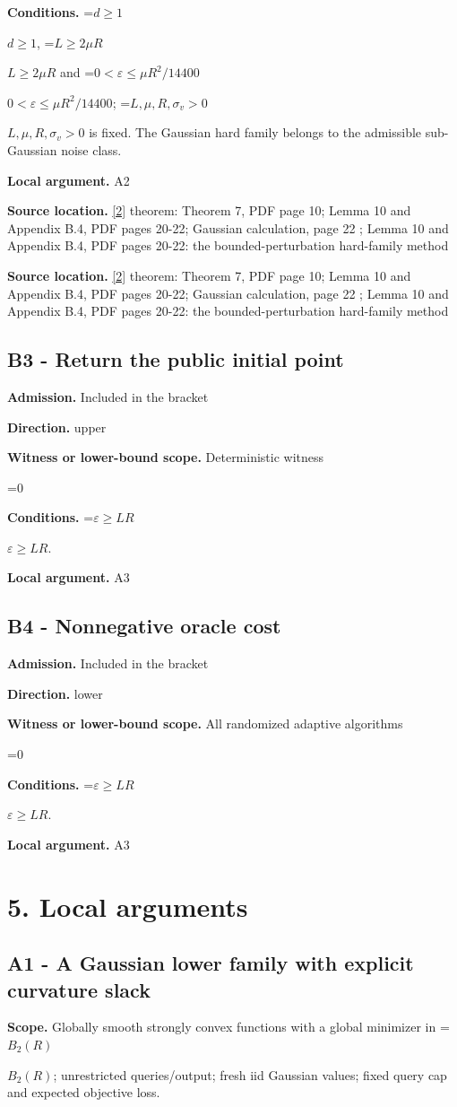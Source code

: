 \documentclass[10pt,a4paper]{article}
\newcommand{\AtlasMath}[1]{\par\begingroup\centering\setbox0=\hbox{$\displaystyle #1$}\ifdim\wd0>1.4\linewidth\typeout{ATLAS WIDE FORMULA: \the\wd0}\fi\ifdim\wd0>\linewidth\resizebox{\linewidth}{!}{\box0}\else\box0\fi\par\endgroup}
\newcommand{\AtlasInlineMath}[1]{\begingroup\setbox0=\hbox{$#1$}\ifdim\wd0>.4\linewidth\endgroup\AtlasMath{#1}\else\endgroup$#1$\fi}
\begin{document}
\textbf{Conditions.} \AtlasInlineMath{d\ge1}, \AtlasInlineMath{L\ge2\mu R} and \AtlasInlineMath{0<\varepsilon\le\mu R^2/14400}; \AtlasInlineMath{L,\mu,R,\sigma_v>0} is fixed. The Gaussian hard family belongs to the admissible sub-Gaussian noise class.

\textbf{Local argument.} A2

\textbf{Source location.} \href{https://proceedings.mlr.press/v30/Shamir13.html}{[2]} theorem: Theorem 7, PDF page 10; Lemma 10 and Appendix B.4, PDF pages 20-22; Gaussian calculation, page 22 ; Lemma 10 and Appendix B.4, PDF pages 20-22: the bounded-perturbation hard-family method

\textbf{Source location.} \href{https://proceedings.mlr.press/v30/Shamir13.html}{[2]} theorem: Theorem 7, PDF page 10; Lemma 10 and Appendix B.4, PDF pages 20-22; Gaussian calculation, page 22 ; Lemma 10 and Appendix B.4, PDF pages 20-22: the bounded-perturbation hard-family method

\subsection{B3 - Return the public initial point}
\textbf{Admission.} Included in the bracket

\textbf{Direction.} upper

\textbf{Witness or lower-bound scope.} Deterministic witness

\AtlasMath{0}
\textbf{Conditions.} \AtlasInlineMath{\varepsilon\ge LR}.

\textbf{Local argument.} A3

\subsection{B4 - Nonnegative oracle cost}
\textbf{Admission.} Included in the bracket

\textbf{Direction.} lower

\textbf{Witness or lower-bound scope.} All randomized adaptive algorithms

\AtlasMath{0}
\textbf{Conditions.} \AtlasInlineMath{\varepsilon\ge LR}.

\textbf{Local argument.} A3

\section{5. Local arguments}
\subsection{A1 - A Gaussian lower family with explicit curvature slack}
\textbf{Scope.} Globally smooth strongly convex functions with a global minimizer in \AtlasInlineMath{B_2(R)}; unrestricted queries/output; fresh iid Gaussian values; fixed query cap and expected objective loss.
\end{document}

